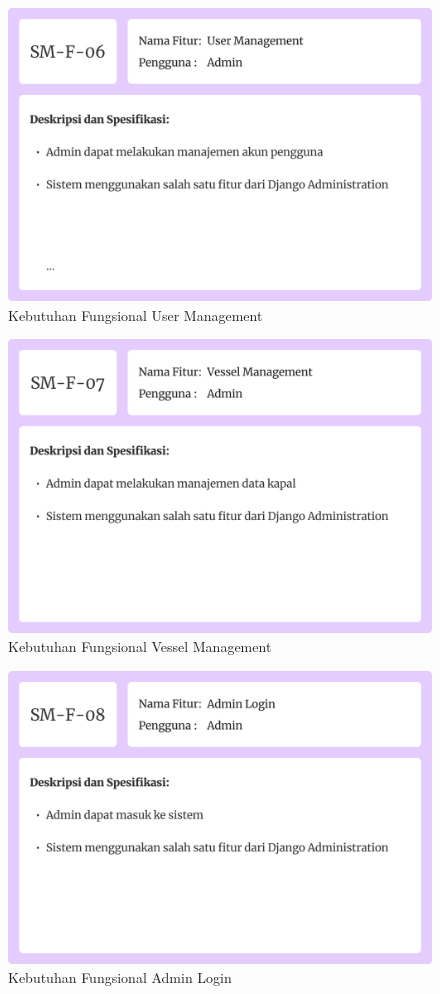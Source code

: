 \begin{figure}[!h]
    \includegraphics[width=.8\linewidth, center]{images/hasil/iterations/3/fr-user.png}
    \caption{Kebutuhan Fungsional User Management}
    \label{fig:fr-user}
\end{figure}
\begin{figure}[!h]
    \includegraphics[width=.8\linewidth, center]{images/hasil/iterations/3/fr-vessel.png}
    \caption{Kebutuhan Fungsional Vessel Management}
    \label{fig:fr-vessel}
\end{figure}
\begin{figure}[!h]
    \includegraphics[width=.8\linewidth, center]{images/hasil/iterations/3/fr-login.png}
    \caption{Kebutuhan Fungsional Admin Login}
    \label{fig:fr-login-admin}
\end{figure}

